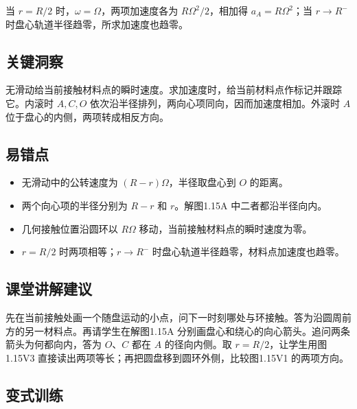 \documentclass[UTF8,fontset=fandol,a4paper,11pt]{ctexart}
\begin{document}
当 $r=R/2$ 时，$\omega=\Omega$，两项加速度各为 $R\Omega^2/2$，相加得 $a_A=R\Omega^2$；当 $r\to R^-$ 时盘心轨道半径趋零，所求加速度也趋零。



\subsection*{关键洞察}

无滑动给当前接触材料点的瞬时速度。求加速度时，给当前材料点作标记并跟踪它。内滚时 $A,C,O$ 依次沿半径排列，两向心项同向，因而加速度相加。外滚时 $A$ 位于盘心的内侧，两项转成相反方向。



\subsection*{易错点}

\begin{itemize}
\item 无滑动中的公转速度为 $(R-r)\Omega$，半径取盘心到 $O$ 的距离。
\item 两个向心项的半径分别为 $R-r$ 和 $r$。解图1.15A 中二者都沿半径向内。
\item 几何接触位置沿圆环以 $R\Omega$ 移动，当前接触材料点的瞬时速度为零。
\item $r=R/2$ 时两项相等；$r\to R^-$ 时盘心轨道半径趋零，材料点加速度也趋零。
\end{itemize}



\subsection*{课堂讲解建议}

先在当前接触处画一个随盘运动的小点，问下一时刻哪处与环接触。答为沿圆周前方的另一材料点。再请学生在解图1.15A 分别画盘心和绕心的向心箭头。追问两条箭头为何都向内，答为 $O$、$C$ 都在 $A$ 的径向内侧。取 $r=R/2$，让学生用图1.15V3 直接读出两项等长；再把圆盘移到圆环外侧，比较图1.15V1 的两项方向。



\subsection*{变式训练}
\end{document}
